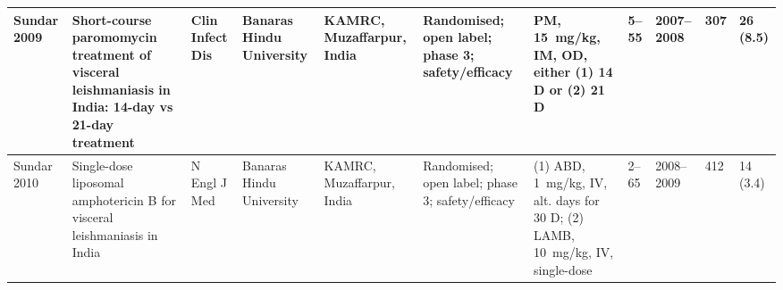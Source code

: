 \begin{ThreePartTable}
\begin{longtable}[c]{L{1.5cm} L{3.5cm} L{1.3cm} L{2.5cm} L{2.5cm} L{2.5cm} L{3cm} L{1.5cm} L{1cm} L{1cm} L{1.3cm}}
    Sundar 2009\cite{sundar2008protB, sundar2009}   & Short-course paromomycin treatment of visceral leishmaniasis in India: 14-day vs 21-day treatment                                                                                                                           & Clin Infect Dis          & Banaras Hindu University                                                             & KAMRC, Muzaffarpur, India                         & Randomised; open label; phase 3; safety/efficacy                                   & PM, 15~mg/kg, IM, OD, either (1) 14 D or (2) 21 D                                                                                                                                                                     & 5--55       & 2007--2008   & 307          & 26 (8.5)                                                                                                                                                                                                                                                                                                                                                                                                                                                                                                                                                                                       \\ \midrule
    Sundar 2010\cite{sundar2008protA, sundar2010}   & Single-dose liposomal amphotericin B for visceral leishmaniasis in India                                                                                                                                                    & N Engl J Med             & Banaras Hindu University                                                             & KAMRC, Muzaffarpur, India                         & Randomised; open label; phase 3; safety/efficacy                                   & (1) ABD, 1~mg/kg, IV, alt. days for 30 D; (2) LAMB, 10~mg/kg, IV, single-dose                                                                                                                                         & 2--65       & 2008--2009   & 412          & 14 (3.4)                                                                                                                                                                                                                                                                                                                                                                                                                                                                                                                                                                                       \\ \midrule

\end{longtable}
\end{ThreePartTable}

